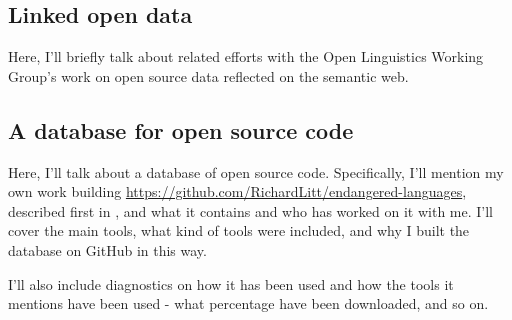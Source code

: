 
\subsection{Linked open data}
\label{subsec:lod}

Here, I'll briefly talk about related efforts with the Open Linguistics Working Group's \citep{chiarcos2012open} work on open source data reflected on the semantic web.\citep{chiarcos2013building}

\subsection{A database for open source code}
\label{sec:solutions}

Here, I'll talk about a database of open source code. Specifically, I'll mention my own work building \href{https://github.com/RichardLitt/endangered-languages}{https://github.com/RichardLitt/endangered-languages}, described first in \citet{CCURL}, and what it contains and who has worked on it with me. I'll cover the main tools, what kind of tools were included, and why I built the database on GitHub in this way.

I'll also include diagnostics on how it has been used and how the tools it mentions have been used - what percentage have been downloaded, and so on.



%



